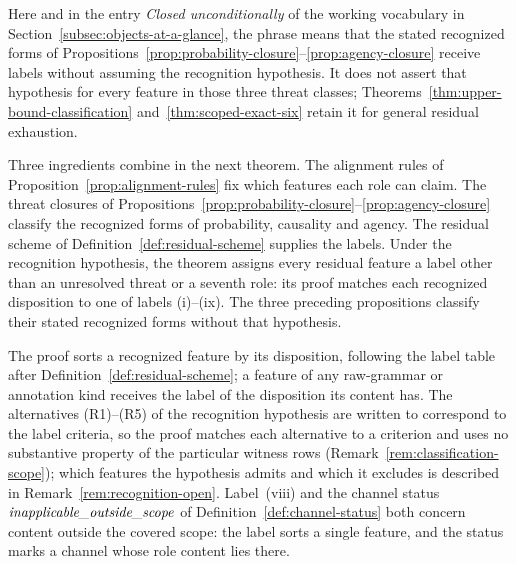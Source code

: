 \documentclass[11pt]{article}
\theoremstyle{definition}
\newcommand{\outsidescope}{\textit{inapplicable\_\allowbreak outside\_\allowbreak scope}}
\begin{document}
Here and in the entry \emph{Closed unconditionally} of the working vocabulary in Section~\ref{subsec:objects-at-a-glance}, the phrase means that the stated recognized forms of Propositions~\ref{prop:probability-closure}--\ref{prop:agency-closure} receive labels without assuming the recognition hypothesis. It does not assert that hypothesis for every feature in those three threat classes; Theorems~\ref{thm:upper-bound-classification} and~\ref{thm:scoped-exact-six} retain it for general residual exhaustion.

Three ingredients combine in the next theorem. The alignment rules of
Proposition~\ref{prop:alignment-rules} fix which features each role can
claim. The threat closures of
Propositions~\ref{prop:probability-closure}--\ref{prop:agency-closure}
classify the recognized forms of probability, causality and agency. The residual scheme of
Definition~\ref{def:residual-scheme} supplies the labels. Under the
recognition hypothesis, the theorem assigns every residual feature a
label other than an unresolved threat or a seventh role: its proof
matches each recognized disposition to one of labels (i)--(ix). The
three preceding propositions classify their stated recognized forms
without that hypothesis.

The proof sorts a recognized feature by its disposition, following the
label table after Definition~\ref{def:residual-scheme}; a feature of any
raw-grammar or annotation kind receives the label of the disposition its
content has. The alternatives (R1)--(R5) of the recognition hypothesis are
written to correspond to the label criteria, so the proof matches each
alternative to a criterion and uses no substantive property of the particular
witness rows (Remark~\ref{rem:classification-scope}); which features the
hypothesis admits and which it excludes is described in
Remark~\ref{rem:recognition-open}.
Label~(viii) and the channel status \(\outsidescope\) of
Definition~\ref{def:channel-status} both concern content outside the
covered scope: the label sorts a single feature, and the status marks a
channel whose role content lies there.
\end{document}
